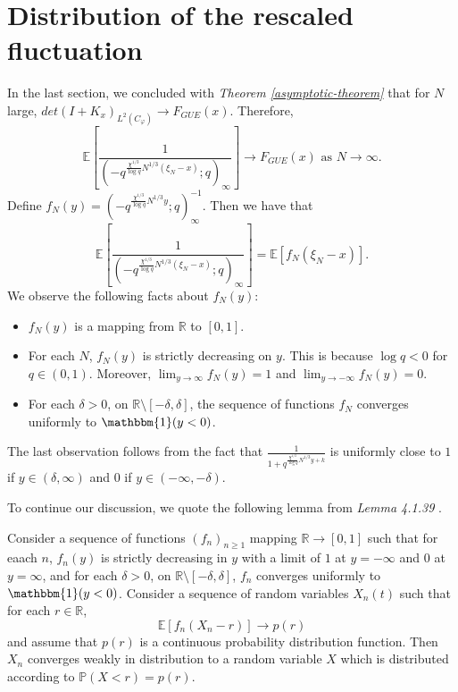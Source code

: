 \section{Distribution of the rescaled fluctuation}
In the last section, we concluded with \textit{Theorem \ref{asymptotic-theorem}} that for $N$ large, $det(I+K_x)_{L^2(C_{\varphi})} \rightarrow F_{GUE}(x)$. Therefore, 
\begin{equation}
\label{finale-equality}
\mathbb{E} \left[ \frac{1}{( -q^{ \frac{\chi^{1/3}}{\log q} N^{1/3} (\xi_N - x) }; q )_{\infty}} \right] \rightarrow F_{GUE}(x) \text{ as } N \rightarrow \infty.
\end{equation}
Define $f_N(y) = (-q^{\frac{\chi^{1/3}}{\log q} N^{1/3} y};q)_{\infty}^{-1}.$ Then we have that $$\mathbb{E} \left[ \frac{1}{( -q^{ \frac{\chi^{1/3}}{\log q} N^{1/3} (\xi_N - x) }; q )_{\infty}} \right] = \mathbb{E} \left[ f_N(\xi_N - x) \right].$$ We observe the following facts about $f_N(y)$:
\begin{itemize}
\item $f_N(y)$ is a mapping from $\mathbb{R}$ to $[0,1]$.
\item For each $N$, $f_N(y)$ is strictly decreasing on $y$. This is because $\log q < 0$ for $q \in (0,1)$. Moreover, $\lim_{y \rightarrow \infty} f_N(y) = 1$ and $\lim_{y \rightarrow -\infty} f_N(y) = 0$.
\item For each $\delta > 0$, on $\mathbb{R} \setminus [-\delta, \delta]$, the sequence of functions $f_N$ converges uniformly to $\mathbbm{1}(y < 0)$.
\end{itemize}
The last observation follows from the fact that $\frac{1}{1+q^{\frac{\chi^{1/3}}{\log q} N^{1/3} y + k}}$ is uniformly close to $1$ if $y \in (\delta, \infty)$ and $0$ if $y \in (-\infty, -\delta)$.

To continue our discussion, we quote the following lemma from \textit{\cite{macdonald2014} Lemma 4.1.39 }. 
\begin{lemma}
\label{last-lemma}
Consider a sequence of functions $(f_n)_{n \ge 1}$ mapping $\mathbb{R} \rightarrow [0,1]$ such that for eaach $n$, $f_n(y)$ is strictly decreasing in $y$ with a limit of $1$ at $y = -\infty$ and $0$ at $y = \infty$, and for each $\delta > 0$, on $\mathbb{R} \setminus [-\delta, \delta]$, $f_n$ converges uniformly to $\mathbbm{1}(y < 0)$. Consider a sequence of random variables $X_n(t)$ such that for each $r \in \mathbb{R}$, $$\mathbb{E} [f_n(X_n - r)] \rightarrow p(r)$$ and assume that $p(r)$ is a continuous probability distribution function. Then $X_n$ converges weakly in distribution to a random variable $X$ which is distributed according to $\mathbb{P}(X < r) = p(r)$.
\end{lemma}

